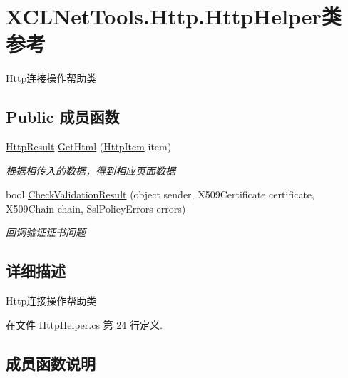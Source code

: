 \hypertarget{class_x_c_l_net_tools_1_1_http_1_1_http_helper}{}\section{X\+C\+L\+Net\+Tools.\+Http.\+Http\+Helper类 参考}
\label{class_x_c_l_net_tools_1_1_http_1_1_http_helper}


Http连接操作帮助类  


\subsection*{Public 成员函数}
\begin{DoxyCompactItemize}
\item 
\hyperlink{class_x_c_l_net_tools_1_1_entity_1_1_http_1_1_http_result}{Http\+Result} \hyperlink{class_x_c_l_net_tools_1_1_http_1_1_http_helper_a1115d0f405e29654961ad3bcd5272bdf}{Get\+Html} (\hyperlink{class_x_c_l_net_tools_1_1_entity_1_1_http_1_1_http_item}{Http\+Item} item)
\begin{DoxyCompactList}\small\item\em 根据相传入的数据，得到相应页面数据 \end{DoxyCompactList}\item 
bool \hyperlink{class_x_c_l_net_tools_1_1_http_1_1_http_helper_aed104c08e4f4e44e2f3b7529e85c2848}{Check\+Validation\+Result} (object sender, X509\+Certificate certificate, X509\+Chain chain, Ssl\+Policy\+Errors errors)
\begin{DoxyCompactList}\small\item\em 回调验证证书问题 \end{DoxyCompactList}\end{DoxyCompactItemize}


\subsection{详细描述}
Http连接操作帮助类 



在文件 Http\+Helper.\+cs 第 24 行定义.



\subsection{成员函数说明}
\mbox{\label{class_x_c_l_net_tools_1_1_http_1_1_http_helper_aed104c08e4f4e44e2f3b7529e85c2848}} 
